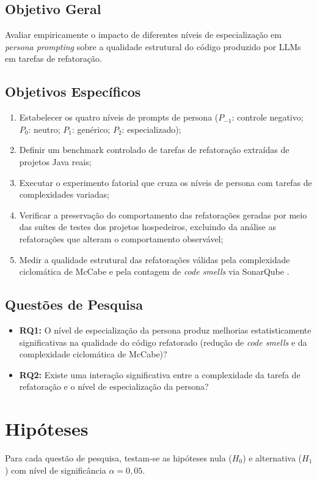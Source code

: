 \documentclass[10pt,conference,a4paper,twocolumn]{article}
\begin{document}
\subsection{Objetivo Geral}
Avaliar empiricamente o impacto de diferentes níveis de especialização em \textit{persona prompting} sobre a qualidade estrutural do código produzido por LLMs em tarefas de refatoração.

\subsection{Objetivos Específicos}
\begin{enumerate}
    \item Estabelecer os quatro níveis de prompts de persona ($P_{-1}$: controle negativo; $P_0$: neutro; $P_1$: genérico; $P_2$: especializado);
    \item Definir um benchmark controlado de tarefas de refatoração extraídas de projetos Java reais;
    \item Executar o experimento fatorial que cruza os níveis de persona com tarefas de complexidades variadas;
    \item Verificar a preservação do comportamento das refatorações geradas por meio das suítes de testes dos projetos hospedeiros, excluindo da análise as refatorações que alteram o comportamento observável;
    \item Medir a qualidade estrutural das refatorações válidas pela complexidade ciclomática de McCabe \cite{mccabe1976} e pela contagem de \textit{code smells} via SonarQube \cite{sonarqube}.
\end{enumerate}

\subsection{Questões de Pesquisa}
\begin{itemize}
    \item \textbf{RQ1:} O nível de especialização da persona produz melhorias estatisticamente significativas na qualidade do código refatorado (redução de \textit{code smells} e da complexidade ciclomática de McCabe)?
    \item \textbf{RQ2:} Existe uma interação significativa entre a complexidade da tarefa de refatoração e o nível de especialização da persona?
\end{itemize}

\section{Hipóteses}
Para cada questão de pesquisa, testam-se as hipóteses nula ($H_0$) e alternativa ($H_1$) com nível de significância $\alpha = 0{,}05$.
\end{document}
